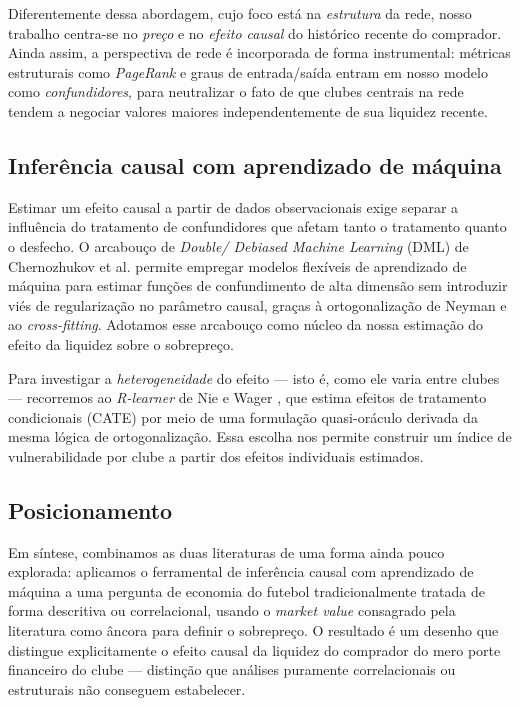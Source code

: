 \documentclass[12pt]{article}
\begin{document}
Diferentemente dessa abordagem, cujo foco está na \textit{estrutura} da rede, nosso trabalho
centra-se no \textit{preço} e no \textit{efeito causal} do histórico recente do comprador. Ainda
assim, a perspectiva de rede é incorporada de forma instrumental: métricas estruturais como
\textit{PageRank} e graus de entrada/saída entram em nosso modelo como \textit{confundidores}, para
neutralizar o fato de que clubes centrais na rede tendem a negociar valores maiores
independentemente de sua liquidez recente.

\subsection{Inferência causal com aprendizado de máquina}

Estimar um efeito causal a partir de dados observacionais exige separar a influência do tratamento
de confundidores que afetam tanto o tratamento quanto o desfecho. O arcabouço de \textit{Double/
Debiased Machine Learning} (DML) de Chernozhukov et al. \cite{chernozhukov2018} permite empregar modelos flexíveis
de aprendizado de máquina para estimar funções de confundimento de alta dimensão sem introduzir viés
de regularização no parâmetro causal, graças à ortogonalização de Neyman e ao \textit{cross-fitting}.
Adotamos esse arcabouço como núcleo da nossa estimação do efeito da liquidez sobre o sobrepreço.

Para investigar a \textit{heterogeneidade} do efeito — isto é, como ele varia entre clubes —
recorremos ao \textit{R-learner} de Nie e Wager \cite{nie2021}, que estima efeitos de tratamento
condicionais (CATE) por meio de uma formulação quasi-oráculo derivada da mesma lógica de
ortogonalização. Essa escolha nos permite construir um índice de vulnerabilidade por clube a partir
dos efeitos individuais estimados.

\subsection{Posicionamento}

Em síntese, combinamos as duas literaturas de uma forma ainda pouco explorada: aplicamos o
ferramental de inferência causal com aprendizado de máquina \cite{chernozhukov2018,nie2021} a uma
pergunta de economia do futebol tradicionalmente tratada de forma descritiva ou correlacional,
usando o \textit{market value} consagrado pela literatura \cite{peeters2018} como âncora para
definir o sobrepreço. O resultado é um desenho que distingue explicitamente o efeito causal da
liquidez do comprador do mero porte financeiro do clube — distinção que análises puramente
correlacionais ou estruturais não conseguem estabelecer.
\end{document}
